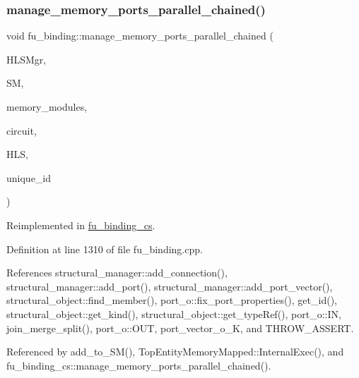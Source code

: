 \subsubsection{\texorpdfstring{manage\+\_\+memory\+\_\+ports\+\_\+parallel\+\_\+chained()}{manage\_memory\_ports\_parallel\_chained()}}
{\footnotesize\ttfamily void fu\+\_\+binding\+::manage\+\_\+memory\+\_\+ports\+\_\+parallel\+\_\+chained (\begin{DoxyParamCaption}\item[{const \hyperlink{hls__manager_8hpp_acd3842b8589fe52c08fc0b2fcc813bfe}{H\+L\+S\+\_\+manager\+Ref}}]{H\+L\+S\+Mgr,  }\item[{const \hyperlink{structural__manager_8hpp_ab3136f0e785d8535f8d252a7b53db5b5}{structural\+\_\+manager\+Ref}}]{SM,  }\item[{const std\+::list$<$ \hyperlink{structural__objects_8hpp_a8ea5f8cc50ab8f4c31e2751074ff60b2}{structural\+\_\+object\+Ref} $>$ \&}]{memory\+\_\+modules,  }\item[{const \hyperlink{structural__objects_8hpp_a8ea5f8cc50ab8f4c31e2751074ff60b2}{structural\+\_\+object\+Ref}}]{circuit,  }\item[{const \hyperlink{hls_8hpp_a75d0c73923d0ddfa28c4843a802c73a7}{hls\+Ref}}]{H\+LS,  }\item[{unsigned int \&}]{unique\+\_\+id }\end{DoxyParamCaption})\hspace{0.3cm}{\ttfamily [virtual]}}



Reimplemented in \hyperlink{classfu__binding__cs_a11b4e8a8b74e18bf3c73c2c535471270}{fu\+\_\+binding\+\_\+cs}.



Definition at line 1310 of file fu\+\_\+binding.\+cpp.



References structural\+\_\+manager\+::add\+\_\+connection(), structural\+\_\+manager\+::add\+\_\+port(), structural\+\_\+manager\+::add\+\_\+port\+\_\+vector(), structural\+\_\+object\+::find\+\_\+member(), port\+\_\+o\+::fix\+\_\+port\+\_\+properties(), get\+\_\+id(), structural\+\_\+object\+::get\+\_\+kind(), structural\+\_\+object\+::get\+\_\+type\+Ref(), port\+\_\+o\+::\+IN, join\+\_\+merge\+\_\+split(), port\+\_\+o\+::\+O\+UT, port\+\_\+vector\+\_\+o\+\_\+K, and T\+H\+R\+O\+W\+\_\+\+A\+S\+S\+E\+RT.



Referenced by add\+\_\+to\+\_\+\+S\+M(), Top\+Entity\+Memory\+Mapped\+::\+Internal\+Exec(), and fu\+\_\+binding\+\_\+cs\+::manage\+\_\+memory\+\_\+ports\+\_\+parallel\+\_\+chained().

